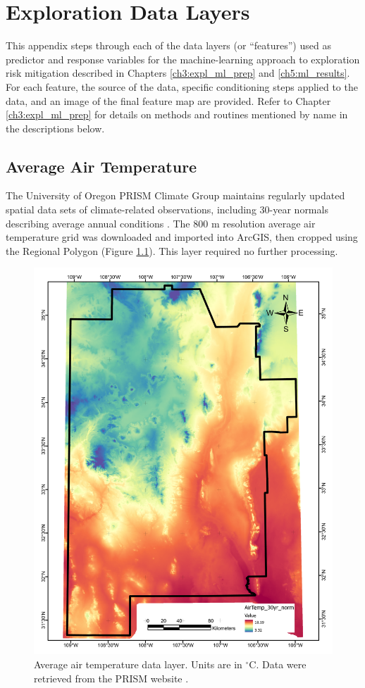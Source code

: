 \chapter{Exploration Data Layers}\label{app:A_data_layers}

This appendix steps through each of the data layers (or ``features'') used as predictor and response variables for the machine-learning approach to exploration risk mitigation described in Chapters \ref{ch3:expl_ml_prep} and \ref{ch5:ml_results}. For each feature, the source of the data, specific conditioning steps applied to the data, and an image of the final feature map are provided. Refer to Chapter \ref{ch3:expl_ml_prep} for details on methods and routines mentioned by name in the descriptions below.
\vfill
\pagebreak

\section{Average Air Temperature}\label{app:dl_air_temp}
The University of Oregon PRISM Climate Group maintains regularly updated spatial data sets of climate-related observations, including 30-year normals describing average annual conditions \citep{daly_physiographically_2008, prism_prism_2021}. The 800 m resolution average air temperature grid was downloaded and imported into ArcGIS, then cropped using the Regional Polygon (Figure \ref{fig:feat_airtemp}). This layer required no further processing.

\begin{figure}[H]
\centering
\includegraphics[width=0.75\linewidth]{templates/images/Figure-AvgAirTemp.pdf}
\caption[Average air temperature data layer]{Average air temperature data layer. Units are in $^\circ$C. Data were retrieved from the PRISM website \protect\citep{prism_prism_2021}.}
\label{fig:feat_airtemp}
\end{figure}
\pagebreak

